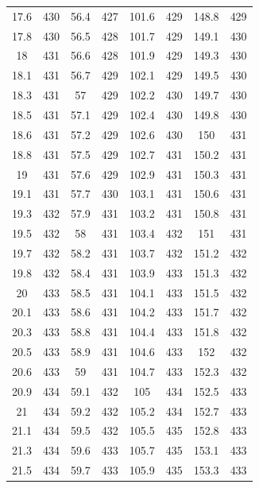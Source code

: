 \documentclass[12pt]{ctexart}
\numberwithin{equation}{section}
\begin{document}
\begin{longtable}{cc|cc|cc|cc}
17.6  &  430  &  56.4  &  427  &  101.6  &  429  &  148.8  &  429  \\
17.8  &  430  &  56.5  &  428  &  101.7  &  429  &  149.1  &  430  \\
18  &  431  &  56.6  &  428  &  101.9  &  429  &  149.3  &  430  \\
18.1  &  431  &  56.7  &  429  &  102.1  &  429  &  149.5  &  430  \\
18.3  &  431  &  57  &  429  &  102.2  &  430  &  149.7  &  430  \\
18.5  &  431  &  57.1  &  429  &  102.4  &  430  &  149.8  &  430  \\
18.6  &  431  &  57.2  &  429  &  102.6  &  430  &  150  &  431  \\
18.8  &  431  &  57.5  &  429  &  102.7  &  431  &  150.2  &  431  \\
19  &  431  &  57.6  &  429  &  102.9  &  431  &  150.3  &  431  \\
19.1  &  431  &  57.7  &  430  &  103.1  &  431  &  150.6  &  431  \\
19.3  &  432  &  57.9  &  431  &  103.2  &  431  &  150.8  &  431  \\
19.5  &  432  &  58  &  431  &  103.4  &  432  &  151  &  431  \\
19.7  &  432  &  58.2  &  431  &  103.7  &  432  &  151.2  &  432  \\
19.8  &  432  &  58.4  &  431  &  103.9  &  433  &  151.3  &  432  \\
20  &  433  &  58.5  &  431  &  104.1  &  433  &  151.5  &  432  \\
20.1  &  433  &  58.6  &  431  &  104.2  &  433  &  151.7  &  432  \\
20.3  &  433  &  58.8  &  431  &  104.4  &  433  &  151.8  &  432  \\
20.5  &  433  &  58.9  &  431  &  104.6  &  433  &  152  &  432  \\
20.6  &  433  &  59  &  431  &  104.7  &  433  &  152.3  &  432  \\
20.9  &  434  &  59.1  &  432  &  105  &  434  &  152.5  &  433  \\
21  &  434  &  59.2  &  432  &  105.2  &  434  &  152.7  &  433  \\
21.1  &  434  &  59.5  &  432  &  105.5  &  435  &  152.8  &  433  \\
21.3  &  434  &  59.6  &  433  &  105.7  &  435  &  153.1  &  433  \\
21.5  &  434  &  59.7  &  433  &  105.9  &  435  &  153.3  &  433  \\

\end{longtable}
\end{document}
